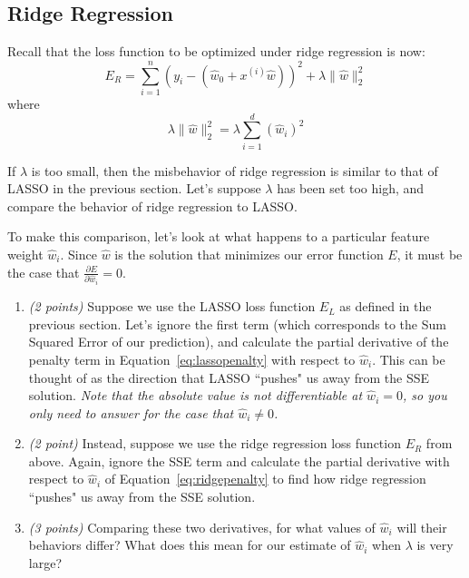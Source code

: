 \documentclass[letterpaper]{article}
\newcommand{\pd}[2]{\frac{\partial #1}{\partial #2}}
\begin{document}
\subsection{Ridge Regression}

Recall that the loss function to be optimized under ridge regression is now:
\[
E_R = \sum_{i=1}^n(y_i - (\hat w_0 + x^{(i)}\hat{w}))^2 + \lambda \| \hat w \|_2^2
\]
where
\begin{equation} \label{eq:ridgepenalty}
\lambda\|\hat w \|_2^2 = \lambda \sum_{i=1}^d (\hat w_i)^2
\end{equation}

 If $\lambda$ is too small, then the misbehavior of ridge regression is similar to that of LASSO in the previous section. Let's suppose $\lambda$ has been set too high, and compare the behavior of ridge regression to LASSO.

\bigskip
\noindent
To make this comparison, let's look at what happens to a particular feature weight $\hat w_i$. Since $\hat w$ is the solution that minimizes our error function $E$, it must be the case that $\pd{E}{\hat w_i} = 0$.

\begin{enumerate}
\item \emph{(2 points)} Suppose we use the LASSO loss function $E_L$ as defined in the previous section. Let's ignore the first term (which corresponds to the Sum Squared Error of our prediction), and calculate the partial derivative of the penalty term in Equation~\ref{eq:lassopenalty} with respect to $\hat w_i$. This can be thought of as the direction that LASSO ``pushes" us away from the SSE solution. \emph{Note that the absolute value is not differentiable at $\hat w_i = 0$, so you only need to answer for the case that $\hat w_i \neq 0$.}

\item \emph{(2 point)} Instead, suppose we use the ridge regression loss function $E_R$ from above. Again, ignore the SSE term and calculate the partial derivative with respect to $\hat w_i$ of Equation~\ref{eq:ridgepenalty} to find how ridge regression ``pushes" us away from the SSE solution.

\item \emph{(3 points)} Comparing these two derivatives, for what values of $\hat w_i$ will their behaviors differ? What does this mean for our estimate of $\hat w_i$ when $\lambda$ is very large?
\end{enumerate}
\end{document}
